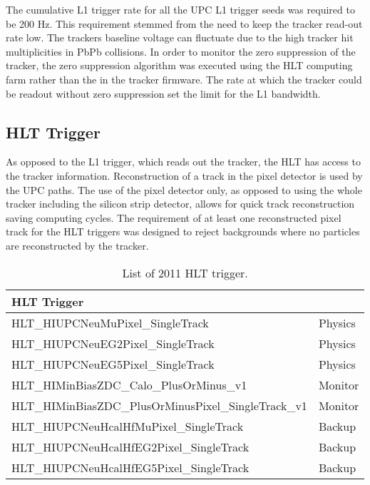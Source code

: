       The cumulative L1 trigger rate for all the UPC L1 trigger seeds was
        required to be 200 Hz.
      This requirement stemmed from the need to keep the tracker read-out rate
        low. 
      The trackers baseline voltage can fluctuate due to the high tracker hit 
        multiplicities in PbPb collisions.
      In order to monitor the zero suppression of the tracker, the zero 
        suppression algorithm was executed using the HLT computing farm 
	      rather than the in the tracker firmware.
      The rate at which the tracker could be readout without zero suppression
        set the limit for the L1 bandwidth.


    \subsection{HLT Trigger}
      As opposed to the L1 trigger, which reads out the tracker, the HLT has 
        access to the tracker information. 
      Reconstruction of a track in the pixel detector is used by the UPC paths.
      The use of the pixel detector only, as opposed to using the whole tracker 
        including the silicon strip detector, allows for quick track 
        reconstruction saving computing cycles.
      The requirement of at least one reconstructed pixel track for the HLT 
        triggers was designed to reject backgrounds where no particles are 
        reconstructed by the tracker. 
  \begin{table}[h]
		\centering
		\begin{tabular}{|l|l|}
		  \hline HLT Trigger  \\ \hline \hline
		  HLT\_HIUPCNeuMuPixel\_SingleTrack & Physics   \\ \hline
		  HLT\_HIUPCNeuEG2Pixel\_SingleTrack & Physics   \\ \hline
		  HLT\_HIUPCNeuEG5Pixel\_SingleTrack & Physics   \\ \hline
		  HLT\_HIMinBiasZDC\_Calo\_PlusOrMinus\_v1  & Monitor  \\ \hline
		  HLT\_HIMinBiasZDC\_PlusOrMinusPixel\_SingleTrack\_v1   & Monitor \\ \hline
		  HLT\_HIUPCNeuHcalHfMuPixel\_SingleTrack & Backup   \\ \hline
		  HLT\_HIUPCNeuHcalHfEG2Pixel\_SingleTrack & Backup   \\ \hline
		  HLT\_HIUPCNeuHcalHfEG5Pixel\_SingleTrack & Backup   \\ \hline \hline
		\end{tabular}
		\caption{List of 2011 HLT trigger.}
		\label{tab:hltTriggers2011}
	\end{table}

